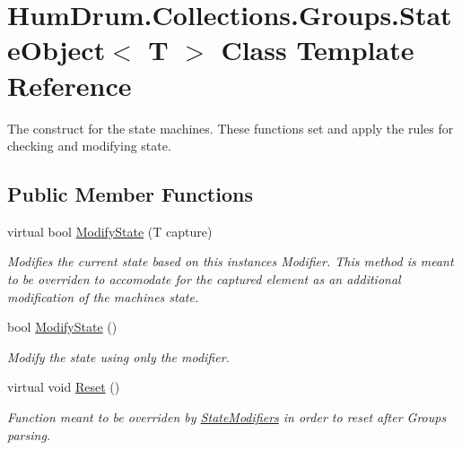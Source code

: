 \hypertarget{classHumDrum_1_1Collections_1_1Groups_1_1StateObject}{}\section{Hum\+Drum.\+Collections.\+Groups.\+State\+Object$<$ T $>$ Class Template Reference}
\label{classHumDrum_1_1Collections_1_1Groups_1_1StateObject}


The construct for the state machines. These functions set and apply the rules for checking and modifying state.  


\subsection*{Public Member Functions}
\begin{DoxyCompactItemize}
\item 
virtual bool \hyperlink{classHumDrum_1_1Collections_1_1Groups_1_1StateObject_a227e83d9109b0022d195afea296ea0fd}{Modify\+State} (T capture)
\begin{DoxyCompactList}\small\item\em Modifies the current state based on this instance\textquotesingle{}s Modifier. This method is meant to be overriden to accomodate for the captured element as an additional modification of the machine\textquotesingle{}s state. \end{DoxyCompactList}\item 
bool \hyperlink{classHumDrum_1_1Collections_1_1Groups_1_1StateObject_a633a33ef5ac78aa8686c49a626f50376}{Modify\+State} ()
\begin{DoxyCompactList}\small\item\em Modify the state using only the modifier. \end{DoxyCompactList}\item 
virtual void \hyperlink{classHumDrum_1_1Collections_1_1Groups_1_1StateObject_aecd06a8d2511a91f5b1422c8fe3836b2}{Reset} ()
\begin{DoxyCompactList}\small\item\em Function meant to be overriden by \hyperlink{namespaceHumDrum_1_1Collections_1_1StateModifiers}{State\+Modifiers} in order to reset after Groups parsing. \end{DoxyCompactList}\end{DoxyCompactItemize}
